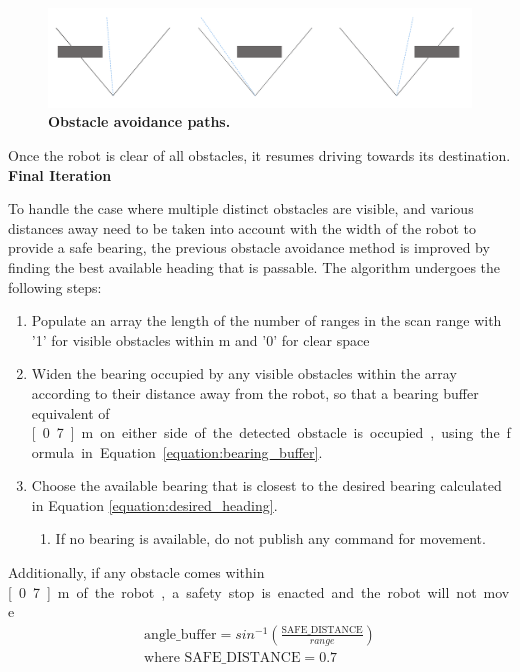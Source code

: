 \documentclass[titlepage,12pt,a4paper]{article}
\begin{document}
\begin{figure}[h]
	\centering
	\includegraphics[scale=0.17]{figures/obstacle2.png}
	\caption{\textbf{Obstacle avoidance paths.}}
\end{figure}

Once the robot is clear of all obstacles, it resumes driving towards its destination. \\

\textbf{Final Iteration}

To handle the case where multiple distinct obstacles are visible, and various distances away need to be taken into account with the width of the robot to provide a safe bearing, the previous obstacle avoidance method is improved by finding the best available heading that is passable. The algorithm undergoes the following steps:

\begin{enumerate}
	\item Populate an array the length of the number of ranges in the scan range with '1' for visible obstacles within \unit[3]{m} and '0' for clear space
	\item Widen the bearing occupied by any visible obstacles within the array according to their distance away from the robot, so that a bearing buffer equivalent of \unit[0.7]{m} on either side of the detected obstacle is occupied, using the formula in Equation \ref{equation:bearing_buffer}.
	\item Choose the available bearing that is closest to the desired bearing calculated in Equation \ref{equation:desired_heading}.
	\begin{enumerate}
		\item If no bearing is available, do not publish any command for movement.
	\end{enumerate}
\end{enumerate}

Additionally, if any obstacle comes within \unit[0.7]{m} of the robot, a safety stop is enacted and the robot will not move.

\begin{equation}
\begin{split}
	\text{angle\_buffer} = sin^{-1}(\frac{\text{SAFE\_DISTANCE}}{range})\\
	\text{where } \text{SAFE\_DISTANCE} = 0.7
\end{split}
	\label{equation:bearing_buffer}
\end{equation}
\end{document}
